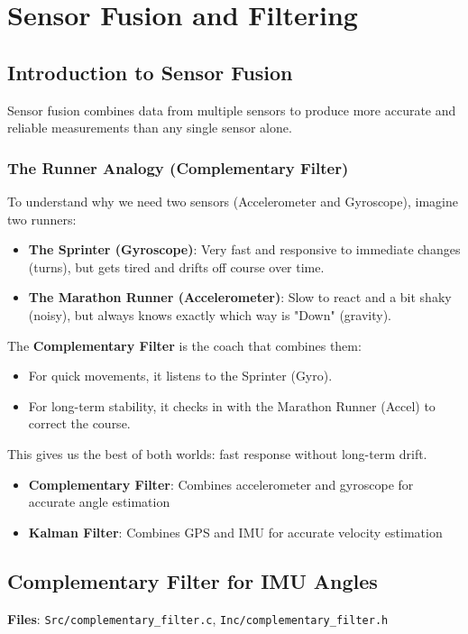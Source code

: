 \documentclass[11pt,a4paper]{article}
\begin{document}
\section{Sensor Fusion and Filtering}

\subsection{Introduction to Sensor Fusion}
Sensor fusion combines data from multiple sensors to produce more accurate and reliable measurements than any single sensor alone.

\subsubsection{The Runner Analogy (Complementary Filter)}
To understand why we need two sensors (Accelerometer and Gyroscope), imagine two runners:

\begin{itemize}
    \item \textbf{The Sprinter (Gyroscope)}: Very fast and responsive to immediate changes (turns), but gets tired and drifts off course over time.
    \item \textbf{The Marathon Runner (Accelerometer)}: Slow to react and a bit shaky (noisy), but always knows exactly which way is "Down" (gravity).
\end{itemize}

The \textbf{Complementary Filter} is the coach that combines them:
\begin{itemize}
    \item For quick movements, it listens to the Sprinter (Gyro).
    \item For long-term stability, it checks in with the Marathon Runner (Accel) to correct the course.
\end{itemize}

This gives us the best of both worlds: fast response without long-term drift.

\begin{itemize}
    \item \textbf{Complementary Filter}: Combines accelerometer and gyroscope for accurate angle estimation
    \item \textbf{Kalman Filter}: Combines GPS and IMU for accurate velocity estimation
\end{itemize}

\subsection{Complementary Filter for IMU Angles}
\textbf{Files}: \texttt{Src/complementary\_filter.c}, \texttt{Inc/complementary\_filter.h}
\end{document}
